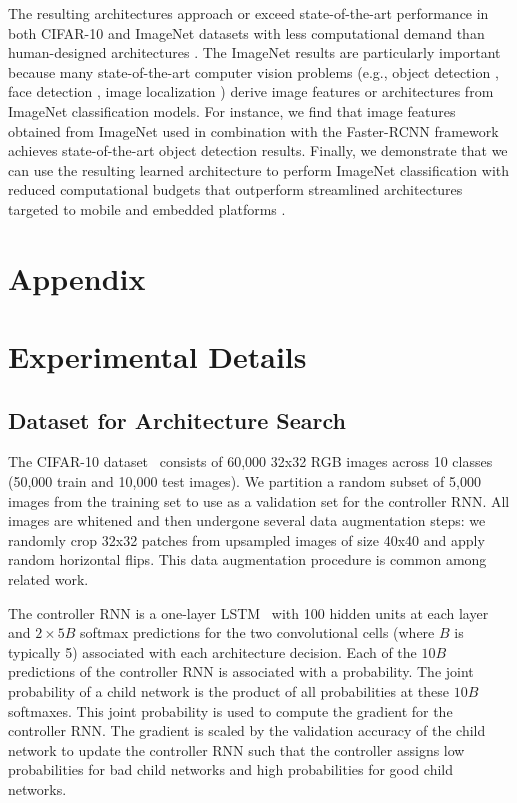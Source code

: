 \documentclass[10pt,twocolumn,letterpaper]{article}
\begin{document}
The resulting architectures approach or exceed state-of-the-art performance in both CIFAR-10 and ImageNet datasets with less computational demand than human-designed architectures \cite{szegedy2016rethinking,BatchNorm,zhang2016polynet}. The ImageNet results are particularly important because many state-of-the-art computer vision problems (e.g.,  object detection \cite{huang2016speed}, face detection \cite{schroff2015facenet}, image localization \cite{weyand2016planet}) derive image features or architectures from ImageNet classification models. For instance, we find that image features obtained from ImageNet used in combination with the Faster-RCNN framework achieves state-of-the-art object detection results. Finally, we demonstrate that we can use the resulting learned architecture to perform ImageNet classification with reduced computational budgets that outperform streamlined architectures targeted to mobile and embedded platforms \cite{howard2017mobilenets, shufflenet}.






{\small


}

\clearpage
\newpage\appendix\section*{Appendix}\section{Experimental Details}\label{section:appendix-details}\subsection{Dataset for Architecture Search}
The CIFAR-10 dataset~\cite{krizhevsky2009learning} consists of 60,000 32x32 RGB images across 10 classes (50,000 train and 10,000 test images).
We partition a random subset of 5,000 images from the training set to use as a validation set for the controller RNN. All images are whitened and then undergone several data augmentation steps: we randomly crop 32x32 patches from upsampled images of size 40x40 and apply random horizontal flips. This data augmentation procedure is common among related work.

The controller RNN is a one-layer LSTM~\cite{lstm} with 100 hidden units at each layer and $2 \times 5B$ softmax predictions for the two convolutional cells (where $B$ is typically 5) associated with each architecture decision. Each of the $10B$ predictions of the controller RNN is associated with a probability. The joint probability of a child network is the product of all probabilities at these $10B$ softmaxes. This joint probability is used to compute the gradient for the controller RNN. The gradient is scaled by the validation accuracy of the child network to update the controller RNN such that the controller assigns low probabilities for bad child networks and high probabilities for good child networks. 
\end{document}
